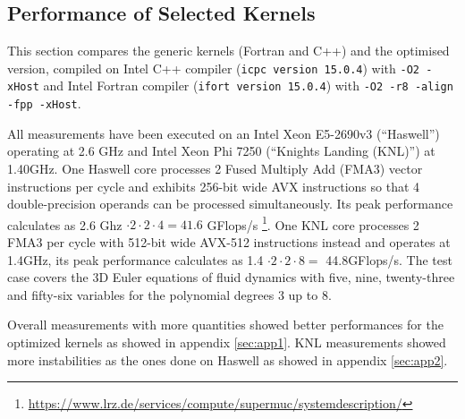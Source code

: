 \documentclass{acm_proc_article-sp}
\begin{document}
\subsection{Performance of Selected Kernels} 
This section compares the generic kernels (Fortran and C++) and the optimised version, compiled on Intel C++ compiler (\texttt{icpc version 15.0.4}) with \texttt{-O2 -xHost} and Intel Fortran compiler (\texttt{ifort version 15.0.4}) with \texttt{-O2 -r8 -align -fpp -xHost}. 

All measurements have been executed on an Intel Xeon E5-2690v3 (``Haswell'') operating at 2.6 GHz and Intel Xeon Phi 7250 (``Knights Landing (KNL)'') at 1.40GHz. One Haswell core processes 2 Fused Multiply Add (FMA3) vector instructions per cycle and exhibits 256-bit wide AVX instructions so that 4 double-precision operands can be processed simultaneously. Its peak performance calculates as 2.6 Ghz $\cdot 2 \cdot 2 \cdot 4 = 41.6$ GFlops/s \footnote{\url{https://www.lrz.de/services/compute/supermuc/systemdescription/}}. One KNL core processes 2 FMA3 per cycle with 512-bit wide AVX-512 instructions instead and operates at 1.4GHz, its peak performance calculates as 1.4 $\cdot 2 \cdot 2 \cdot 8 = $ 44.8GFlops/s. The test case covers the 3D Euler equations of fluid dynamics with five, nine, twenty-three and fifty-six variables for the polynomial degrees 3 up to 8.

{\color{red}Overall measurements with more quantities showed better performances for the optimized kernels as showed in appendix \ref{sec:app1}. KNL measurements showed more instabilities as the ones done on Haswell as showed in appendix \ref{sec:app2}.}
\end{document}
